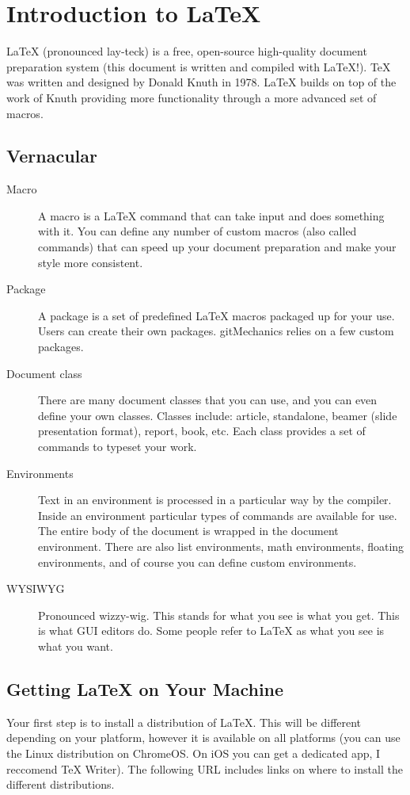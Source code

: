 \section{Introduction to \LaTeX{}}
\LaTeX{} (pronounced lay-teck) is a free, open-source high-quality document preparation system (this document is written and compiled with \LaTeX{}!). \TeX{} was written and designed by Donald Knuth in 1978. \LaTeX{} builds on top of the work of Knuth providing more functionality through a more advanced set of macros.

\subsection{Vernacular}

\begin{description}
	\item[Macro] A macro is a \LaTeX{} command that can take input and does something with it. You can define any number of custom macros (also called commands) that can speed up your document preparation and make your style more consistent.
	\item[Package] A package is a set of predefined \LaTeX{} macros packaged up for your use. Users can create their own packages. gitMechanics relies on a few custom packages.
	\item[Document class] There are many document classes that you can use, and you can even define your own classes. Classes include: article, standalone, beamer (slide presentation format), report, book, etc. Each class provides a set of commands to typeset your work.
	\item[Environments] Text in an environment is processed in a particular way by the compiler. Inside an environment particular types of commands are available for use. The entire body of the document is wrapped in the document environment. There are also list environments, math environments, floating environments, and of course you can define custom environments.
	\item[WYSIWYG] Pronounced wizzy-wig. This stands for what you see is what you get. This is what GUI editors do. Some people refer to \LaTeX{} as what you see is what you want.
\end{description}

\subsection{Getting \LaTeX{} on Your Machine}
Your first step is to install a distribution of \LaTeX{}. This will be different depending on your platform, however it is available on all platforms (you can use the Linux distribution on ChromeOS. On iOS you can get a dedicated app, I reccomend TeX Writer). The following URL includes links on where to install the different distributions.

